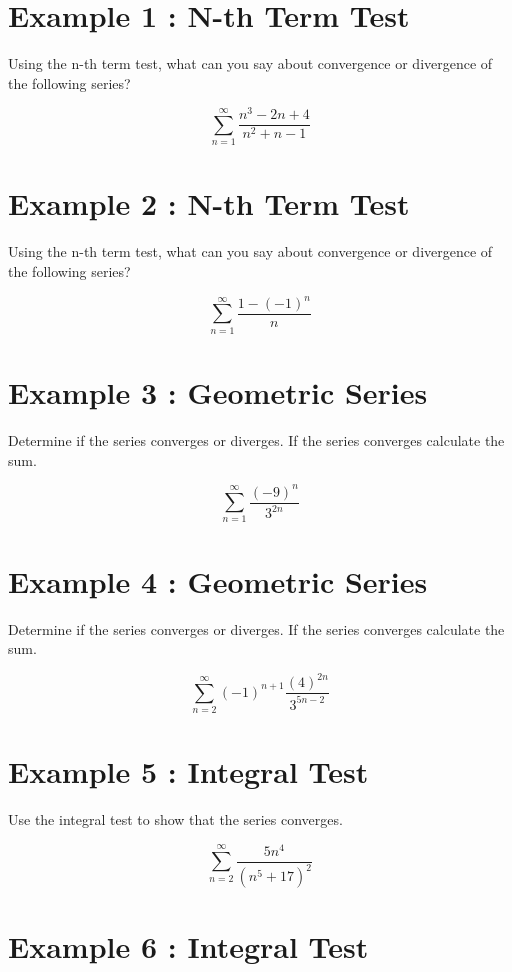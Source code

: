 \documentclass[11pt]{article}
\begin{document}
\section*{Example 1 : N-th Term Test}

Using the n-th term test, what can you say about convergence or divergence of the
following series?

$$\sum_{n=1}^\infty \frac{n^3 - 2n + 4}{n^2+n - 1} $$

\newpage

\section*{Example 2 : N-th Term Test}

Using the n-th term test, what can you say about convergence or divergence of the
following series?

$$\sum_{n=1}^\infty \frac{1-(-1)^n}{n} $$

\newpage

\section*{Example 3 : Geometric Series}

Determine if the series converges or diverges. If the series converges calculate the sum. 

$$\sum_{n=1}^\infty \frac{(-9)^n}{3^{2n}}$$

\newpage

\section*{Example 4 : Geometric Series}

Determine if the series converges or diverges. If the series converges calculate the sum. 

$$\sum_{n=2}^\infty (-1)^{n+1}\frac{(4)^{2n}}{3^{5n-2}}$$

\newpage

\section*{Example 5 : Integral Test}

Use the integral test to show that the series converges.

$$\sum_{n=2}^\infty \frac{5n^4}{(n^5+17)^2}$$

\newpage

\section*{Example 6 : Integral Test}
\end{document}
